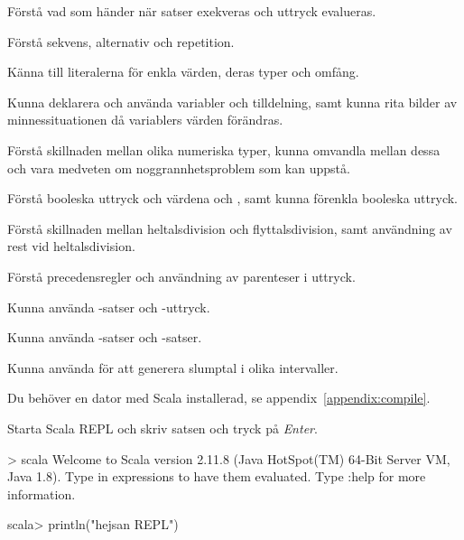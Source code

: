
\Exercise{\ExeWeekONE}\label{exe:W01}

\begin{Goals}
\item Förstå vad som händer när satser exekveras och uttryck evalueras.
\item Förstå sekvens, alternativ och repetition.
\item Känna till literalerna för enkla värden, deras typer och omfång.
\item Kunna deklarera och använda variabler och tilldelning, samt kunna rita bilder av minnessituationen då variablers värden förändras.
\item Förstå skillnaden mellan olika numeriska typer, kunna omvandla mellan dessa och vara medveten om noggrannhetsproblem som kan uppstå.
\item Förstå booleska uttryck och värdena  och , samt kunna förenkla booleska uttryck.
\item Förstå skillnaden mellan heltalsdivision och flyttalsdivision, samt användning av rest vid heltalsdivision.
\item Förstå precedensregler och användning av parenteser i uttryck.
\item Kunna använda -satser och -uttryck.
\item Kunna använda -satser och -satser.
\item Kunna använda  för att generera slumptal i olika intervaller.
\end{Goals}

\begin{Preparations}
\item {}
\item Du behöver en dator med Scala installerad, se appendix~\ref{appendix:compile}.
\end{Preparations}

\BasicTasks

\Task Starta Scala REPL  och skriv satsen  och tryck på \textit{Enter}. %

\begin{REPLnonum}
> scala
Welcome to Scala version 2.11.8 (Java HotSpot(TM) 64-Bit Server VM, Java 1.8).
Type in expressions to have them evaluated.
Type :help for more information.

scala> println("hejsan REPL")
\end{REPLnonum}

